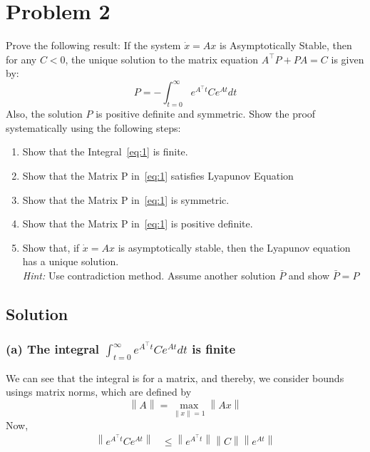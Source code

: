 \section*{Problem 2}

Prove the following result:
If the system \( \dot{x}=A x \) is Asymptotically Stable, then for any \( C<0 \), the unique solution to the matrix equation \( A^{\top} P+P A=C \) is given by:
\begin{equation*}\label{eq:1}
    P=-\int_{t=0}^{\infty} e^{A^{\top} t} C e^{A t} d t \tag{1}
\end{equation*}
Also, the solution \( P \) is positive definite and symmetric.
Show the proof systematically using the following steps:
\begin{enumerate}[label= (\alph*)]
    \item Show that the Integral~\ref{eq:1} is finite.
    \item Show that the Matrix P in~\ref{eq:1} satisfies Lyapunov Equation
    \item Show that the Matrix P in~\ref{eq:1} is symmetric.
    \item Show that the Matrix P in~\ref{eq:1} is positive definite.
    \item Show that, if \( \dot{x}=A x \) is asymptotically stable, then the Lyapunov equation has a unique solution. \\
          \textit{Hint:} Use contradiction method. Assume another solution \( \bar{P} \) and show \( \bar{P}=P \)
\end{enumerate}

\subsection*{Solution}

\subsubsection*{(a) The integral \( \displaystyle \int_{t=0}^{\infty} e^{A^{\top} t} C e^{A t} d t \) is finite}

We can see that the integral is for a matrix, and thereby, we consider bounds usings matrix norms, which are defined by
\begin{equation*}
    \left \| A \right \| = \max_{\left \| x \right \| = 1} \left \| A x \right \|
\end{equation*}
Now,
\begin{align*}
    \left \| e^{A^{\top} t} C e^{A t} \right \|
     & \leq
    \left \| e^{A^{\top} t} \right \| \left \| C \right \| \left \| e^{A t} \right \|
\end{align*}

